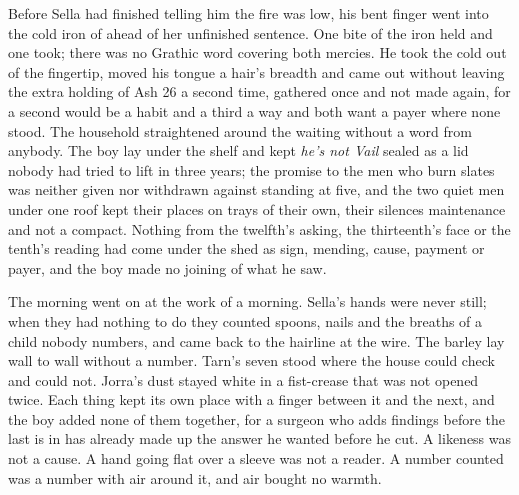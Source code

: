 Before Sella had finished telling him the fire was low, his bent finger went into the cold iron of  ahead of her unfinished sentence. One bite of the iron held and one took; there was no Grathic word covering both mercies. He took the cold out of the fingertip, moved his tongue a hair's breadth and came out without leaving the extra holding of Ash 26 a second time, gathered once and not made again, for a second would be a habit and a third a way and both want a payer where none stood. The household straightened around the waiting without a word from anybody. The boy lay under the shelf and kept \emph{he's not Vail} sealed as a lid nobody had tried to lift in three years; the promise to the men who burn slates was neither given nor withdrawn against  standing at five, and the two quiet men under one roof kept their places on trays of their own, their silences maintenance and not a compact. Nothing from the twelfth's asking, the thirteenth's face or the tenth's reading had come under the shed as sign, mending, cause, payment or payer, and the boy made no joining of what he saw.

The morning went on at the work of a morning. Sella's hands were never still; when they had nothing to do they counted spoons, nails and the breaths of a child nobody numbers, and came back to the hairline at the wire. The barley lay wall to wall without a number. Tarn's seven stood where the house could check and could not. Jorra's dust stayed white in a fist-crease that was not opened twice. Each thing kept its own place with a finger between it and the next, and the boy added none of them together, for a surgeon who adds findings before the last is in has already made up the answer he wanted before he cut. A likeness was not a cause. A hand going flat over a sleeve was not a reader. A number counted was a number with air around it, and air bought no warmth.

